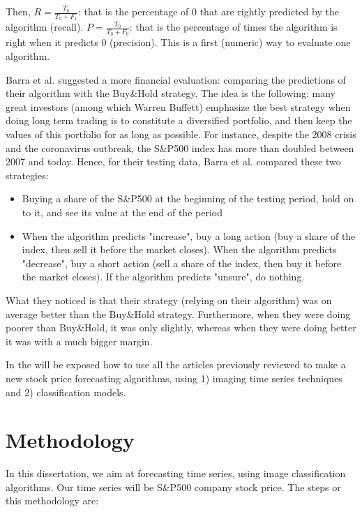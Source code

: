 \documentclass[11pt]{article}
\begin{document}
\begin{onehalfspace}
Then, $R = \frac{T_0}{T_0 + F_1}$: that is the percentage of 0 that are rightly predicted by the algorithm (recall). $P = \frac{T_0}{T_0 + F_0}$: that is the percentage of times the algorithm is right when it predicts 0 (precision). This is a first (numeric) way to evaluate one algorithm.

Barra et al. \cite{barra} suggested a more financial evaluation: comparing the predictions of their algorithm with the Buy\&Hold strategy. The idea is the following: many great investors (among which Warren Buffett) emphasize the best strategy when doing long term trading is to constitute a diversified portfolio, and then keep the values of this portfolio for as long as possible. For instance, despite the 2008 crisis and the coronavirus outbreak, the S\&P500 index has more than doubled between 2007 and today. Hence, for their testing data, Barra et al. compared these two strategies:

\begin{itemize}
    \item Buying a share of the S\&P500 at the beginning of the testing period, hold on to it, and see its value at the end of the period
    \item When the algorithm predicts "increase", buy a long action (buy a share of the index, then sell it before the market closes). When the algorithm predicts "decrease", buy a short action (sell a share of the index, then buy it before the market closes). If the algorithm predicts "unsure", do nothing. 
\end{itemize}

What they noticed is that their strategy (relying on their algorithm) was on average better than the Buy\&Hold strategy. Furthermore, when they were doing poorer than Buy\&Hold, it was only slightly, whereas when they were doing better it was with a much bigger margin. 

In the  will be exposed how to use all the articles previously reviewed to make a new stock price forecasting algorithms, using 1) imaging time series techniques and 2) classification models.

\pagebreak

\section{Methodology}
\label{methodo}

In this dissertation, we aim at forecasting time series, using image classification algorithms. Our time series will be S\&P500 company stock price. The steps or this methodology are:


\end{onehalfspace}
\end{document}
